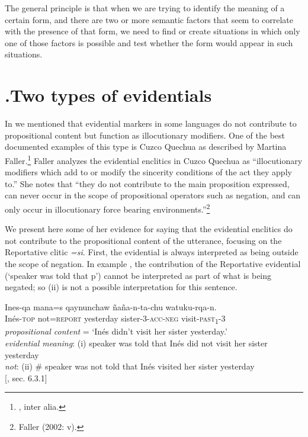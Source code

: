 The general principle is that when we are trying to identify the meaning of a certain form, and there are two or more semantic factors that seem to correlate with the presence of that form, we need to find or create situations in which only one of those factors is possible and test whether the form would appear in such situations.


\section{.Two types of evidentials}\label{sec:} %

In  we mentioned that evidential markers in some languages do not contribute to propositional content but function as illocutionary modifiers. One of the best documented examples of this type is Cuzco Quechua as described by Martina Faller.\footnote{\citet{Faller2002,Faller2003,Faller2006}, inter alia.} Faller analyzes the evidential enclitics in Cuzco Quechua as “illocutionary modifiers which add to or modify the sincerity conditions of the act they apply to.” She notes that “they do not contribute to the main proposition expressed, can never occur in the scope of propositional operators such as negation, and can only occur in illocutionary force bearing environments.”\footnote{Faller (2002: v).}



We present here some of her evidence for saying that the evidential enclitics do not contribute to the propositional content of the utterance, focusing on the Reportative clitic \textit{=si}. First, the evidential is always interpreted as being outside the scope of negation. In example , the contribution of the Reportative evidential (‘speaker was told that p’) cannot be interpreted as part of what is being negated; so (ii) is not a possible interpretation for this sentence.


\ea
\gll Ines-qa  mana=s  qaynunchaw  ñaña-n-ta-chu  watuku-rqa-n.\\
Inés-\textsc{top}  not=\textsc{report}  yesterday  sister-3-\textsc{acc-neg}  visit\textsc{-past}\textsc{\textsubscript{1}}-3\\
\glt \textit{propositional content} = ‘Inés didn’t visit her sister yesterday.’\\
\textit{evidential meaning}: (i) speaker was told that Inés did not visit her sister yesterday\\
  \textit{not}:  (ii) \# speaker was not told that Inés visited her sister yesterday\\
{}[\citealt{Faller2002}, sec. 6.3.1]
\z


